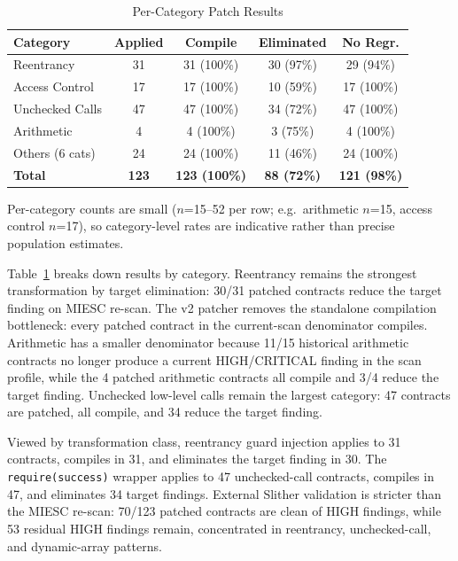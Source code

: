 \documentclass[conference]{IEEEtran}
\begin{document}
\begin{table}[htbp]
\caption{Per-Category Patch Results}
\label{tab:fix-category}
\centering
\begin{tabular}{@{}lcccc@{}}
\toprule
\textbf{Category} & \textbf{Applied} & \textbf{Compile} & \textbf{Eliminated} & \textbf{No Regr.} \\
\midrule
Reentrancy & 31 & 31 (100\%) & 30 (97\%) & 29 (94\%) \\
Access Control & 17 & 17 (100\%) & 10 (59\%) & 17 (100\%) \\
Unchecked Calls & 47 & 47 (100\%) & 34 (72\%) & 47 (100\%) \\
Arithmetic & 4 & 4 (100\%) & 3 (75\%) & 4 (100\%) \\
Others (6 cats) & 24 & 24 (100\%) & 11 (46\%) & 24 (100\%) \\
\midrule
\textbf{Total} & \textbf{123} & \textbf{123 (100\%)} & \textbf{88 (72\%)} & \textbf{121 (98\%)} \\
\bottomrule
\end{tabular}

\vspace{2pt}
\footnotesize{Per-category counts are small ($n$=15--52 per row; e.g.\ arithmetic $n$=15, access control $n$=17), so category-level rates are indicative rather than precise population estimates.}
\end{table}

Table~\ref{tab:fix-category} breaks down results by category. Reentrancy remains the strongest transformation by target elimination: 30/31 patched contracts reduce the target finding on MIESC re-scan. The v2 patcher removes the standalone compilation bottleneck: every patched contract in the current-scan denominator compiles. Arithmetic has a smaller denominator because 11/15 historical arithmetic contracts no longer produce a current HIGH/CRITICAL finding in the scan profile, while the 4 patched arithmetic contracts all compile and 3/4 reduce the target finding. Unchecked low-level calls remain the largest category: 47 contracts are patched, all compile, and 34 reduce the target finding.

Viewed by transformation class, reentrancy guard injection applies to 31 contracts, compiles in 31, and eliminates the target finding in 30. The \texttt{require(success)} wrapper applies to 47 unchecked-call contracts, compiles in 47, and eliminates 34 target findings. External Slither validation is stricter than the MIESC re-scan: 70/123 patched contracts are clean of HIGH findings, while 53 residual HIGH findings remain, concentrated in reentrancy, unchecked-call, and dynamic-array patterns.
\end{document}
